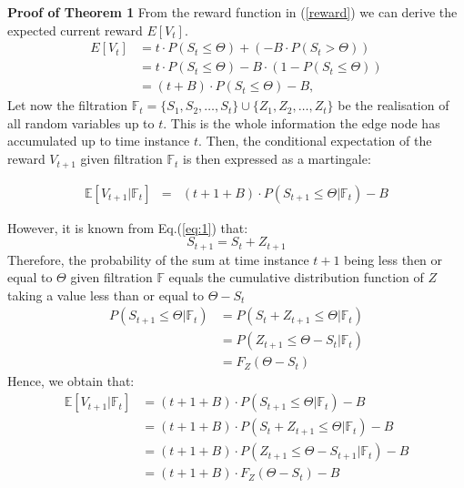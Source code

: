 \documentclass{mpaper}
\begin{document}
\textbf{Proof of Theorem 1}
From the reward function in (\ref{reward}) we can derive the expected current reward $E[V_t]$. 
\begin{equation}
\begin{split}
    E[V_t] & = t \cdot P(S_t \leq \Theta) + (-B \cdot P(S_t > \Theta))\\
    & = t \cdot P(S_t \leq \Theta) - B \cdot (1 - P(S_t \leq \Theta))\\
    & = (t + B) \cdot P(S_t \leq \Theta) - B,
\end{split}
\end{equation}
Let now the filtration $\mathbb{F}_{t} = \{S_{1}, S_{2}, \ldots, S_{t}\} \cup \{Z_{1}, Z_{2}, \ldots, Z_{t}\}$ be the realisation of all random variables up to $t$. This is the whole information the edge node has accumulated up to time instance $t$. 
Then, the conditional expectation of the reward $V_{t+1}$ given filtration $\mathbb{F}_{t}$ is then expressed as a martingale:

\begin{eqnarray}
    \mathbb{E}[V_{t+1}|\mathbb{F}_{t}] & = & (t + 1 + B) \cdot P(S_{t+1} \leq \Theta | \mathbb{F}_t) - B
\end{eqnarray}

However, it is known from Eq.(\ref{eq:1}) that:
\begin{equation}
    S_{t+1} = S_t + Z_{t+1}
\end{equation}
Therefore, the probability of the sum at time instance $t+1$ being less then or equal to $\Theta$ given filtration $\mathbb{F}$ equals the cumulative distribution function of $Z$ taking a value less than or equal to $\Theta - S_t$ 
\begin{align*}
    P(S_{t+1} \leq \Theta | \mathbb{F}_t) &= P(S_t + Z_{t+1} \leq \Theta| \mathbb{F}_t)\\
                           &= P(Z_{t+1}\leq\Theta-S_t| \mathbb{F}_t)\\
                           &= F_{Z}(\Theta - S_t)
\end{align*}
Hence, we obtain that:
\begin{align*}
    \mathbb{E}[V_{t+1}|\mathbb{F}_{t}] &= (t + 1 + B) \cdot P(S_{t+1} \leq \Theta | \mathbb{F}_t) - B\\
    &=(t + 1 + B) \cdot P(S_{t}+Z_{t+1} \leq \Theta | \mathbb{F}_{t}) - B\\
    &=(t + 1 + B) \cdot P(Z_{t+1} \leq \Theta-S_{t+1} | \mathbb{F}_{t}) - B\\
    &=(t + 1 + B) \cdot F_{Z}(\Theta-S_{t}) - B\\
\end{align*}
\end{document}
